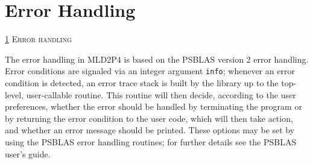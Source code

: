\section{Error Handling}\label{sec:errors}
         {\textsc{\ref{sec:errors} Error handling}}

The error handling in MLD2P4 is based on the PSBLAS version 2 error
handling. Error conditions are signaled via an integer argument
\verb|info|; whenever an error condition is detected, an error trace
stack is built by the library up to the top-level, user-callable
routine. This routine will then decide, according to the user
preferences, whether the error should be handled by terminating the
program or by returning the error condition to the user code, which
will then take action, and whether
an error message should  be printed. These options may be set by using
the PSBLAS error handling routines; for further details see the PSBLAS
user's guide. 

